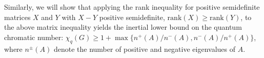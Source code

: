\documentclass[12pt,a4paper]{article}
\begin{document}
Similarly, we will show that applying the rank inequality for positive semidefinite matrices $X$ and $Y$ with $X-Y$ positive semidefinite, $\mathrm{rank}(X)\ge\mathrm{rank}(Y)$, to the above matrix inequality yields the inertial lower bound on the quantum chromatic number: $\chi_q(G)\ge 1 + \max\{n^+(A)/n^-(A), n^-(A) / n^+(A)\}$, where $n^\pm(A)$ denote the number of positive and negative eigenvalues of $A$.










\end{document}
